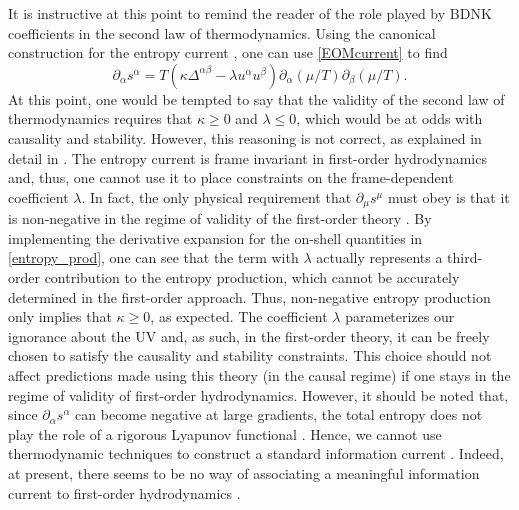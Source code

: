 \documentclass[aps,prd,nofootinbib,amsmath,amssymb,showpacs,longbibliography,singlecolumn,superscriptaddress,notitlepage]{revtex4-1}
\theoremstyle{plain}
\theoremstyle{definition}
\newcommand{\be}{\begin{equation}}
\newcommand{\ee}{\end{equation}}
\begin{document}
It is instructive at this point to remind the reader of the role played by BDNK coefficients in the second law of thermodynamics. Using the canonical construction for the entropy current \cite{Kovtun:2012rj}, one can use \eqref{EOMcurrent} to find 
\be
\partial_\alpha s^\alpha = T\left(\kappa \Delta^{\alpha\beta}-\lambda u^\alpha u^\beta\right)\partial_\alpha(\mu/T) \partial_\beta (\mu/T). 
\label{entropy_prod}
\ee
At this point, one would be tempted to say that the validity of the second law of thermodynamics requires that $\kappa\geq 0$ and $\lambda \leq 0$, which would be at odds with causality and stability. However, this reasoning is not correct, as explained in detail in \cite{Kovtun:2019hdm}. The entropy current is frame invariant in first-order hydrodynamics and, thus, one cannot use it to place constraints on the frame-dependent coefficient $\lambda$. In fact, the only physical requirement that $\partial_\mu s^\mu$ must obey is that it is non-negative in the regime of validity of the first-order theory \cite{Gavassino:2020ubn}. By implementing the derivative expansion for the on-shell quantities in \eqref{entropy_prod}, one can see that the term with $\lambda$ actually represents a third-order contribution to the entropy production, which cannot be accurately determined in the first-order approach. Thus, non-negative entropy production only implies that $\kappa \geq 0$, as expected. The coefficient $\lambda$ parameterizes our ignorance about the UV and, as such, in the first-order theory, it can be freely chosen to satisfy the causality and stability constraints. This choice should not affect predictions made using this theory (in the causal regime) if one stays in the regime of validity of first-order hydrodynamics. However, it should be noted that, since $\partial_\alpha s^\alpha$ can become negative at large gradients, the total entropy does not play the role of a rigorous Lyapunov functional \cite{Gavassino:2021cli}. Hence, we cannot use thermodynamic techniques to construct a standard information current \cite{Gavassino:2023odx}. Indeed, at present, there seems to be no way of associating a meaningful information current to first-order hydrodynamics \cite{Gavassino:2020ubn,Dore:2021xqq}.
\end{document}
